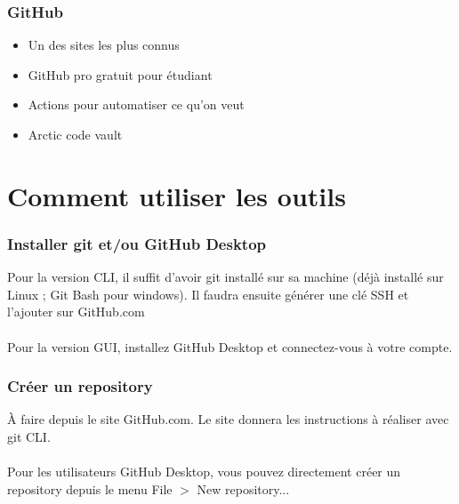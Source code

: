 \documentclass{beamer}
\begin{document}

\begin{frame}\frametitle{GitHub}
\begin{itemize}
    \item Un des sites les plus connus
    \item GitHub pro gratuit pour étudiant
    \item Actions pour automatiser ce qu'on veut
    \item Arctic code vault
\end{itemize}
\end{frame}

\section{Comment utiliser les outils} %

\begin{frame}\frametitle{Installer git et/ou GitHub Desktop}
    Pour la version CLI, il suffit d'avoir git installé sur sa machine (déjà installé sur Linux ; Git Bash pour windows). Il faudra ensuite générer une clé SSH et l'ajouter sur GitHub.com \\~\\

    Pour la version GUI, installez GitHub Desktop et connectez-vous à votre compte. 
\end{frame}


\begin{frame}\frametitle{Créer un repository}
    À faire depuis le site GitHub.com. Le site donnera les instructions à réaliser avec git CLI. \\~\\

    Pour les utilisateurs GitHub Desktop, vous pouvez directement créer un repository depuis le menu File $>$ New repository... 
\end{frame}

\end{document}

